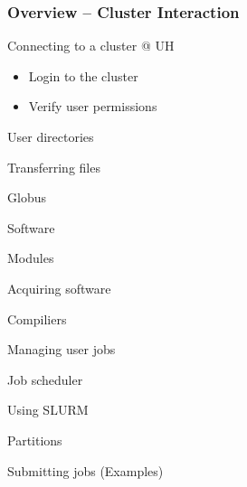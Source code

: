 \documentclass[t,hyperref={pdfpagelabels=false}]{beamer}
\newcommand{\semitransp}[2][35]{\color{fg!#1}#2}
\begin{document}
\begin{frame}
	\frametitle{Overview -- Cluster Interaction}
	\begin{itemize}
		\item{Connecting to a cluster @ UH}
			\begin{itemize}
			\item Login to the cluster
			\item Verify user permissions
			\end{itemize}
    {\semitransp[25]{\item User directories
		\item Transferring files
		\begin{itemize}{\semitransp[25]{
			\item Globus
		}}\end{itemize}
		\item Software
		\begin{itemize}{\semitransp[25]{
			\item Modules
			\item Acquiring software
			\item Compiliers
			}}
		\end{itemize}
		\item Managing user jobs
		\begin{itemize}{\semitransp[25]{
			\item Job scheduler
			\item Using SLURM
			\item Partitions			
			\item Submitting jobs (Examples)
			}}
		\end{itemize}			
		}}
	\end{itemize}
\end{frame}
\end{document}
